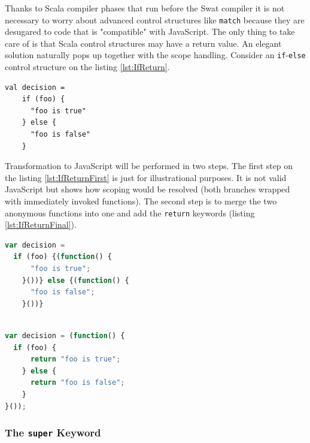 \documentclass[12pt,a4paper]{report}
\begin{document}
Thanks to Scala compiler phases that run before the Swat compiler it is not necessary to worry about advanced control structures like \texttt{match} because they are desugared to code that is "compatible" with JavaScript. The only thing to take care of is that Scala control structures may have a return value. An elegant solution naturally pops up together with the scope handling. Consider an \texttt{if}-\texttt{else} control structure on the listing \ref{lst:IfReturn}.

\begin{minipage}{\linewidth}
\begin{lstlisting}[caption={A condition with return value.},label={lst:IfReturn}]
val decision = 
	if (foo) {
	  "foo is true"
	} else {
	  "foo is false"
	}
\end{lstlisting}
\end{minipage}

Transformation to JavaScript will be performed in two steps. The first step on the listing \ref{lst:IfReturnFirst} is just for illustrational purposes. It is not valid JavaScript but shows how scoping would be resolved (both branches wrapped with immediately invoked functions). The second step is to merge the two anonymous functions into one and add the \texttt{return} keywords (listing \ref{lst:IfReturnFinal}).

\begin{center}
\begin{minipage}{.48\textwidth}
  \begin{lstlisting}[language=JavaScript,caption={The first step of condition compilation.},label={lst:IfReturnFirst},showlines=true]
var decision =
  if (foo) {(function() {
	  "foo is true";
	}())} else {(function() {
	  "foo is false";
	}())}
	
  \end{lstlisting}
\end{minipage}
\hfill
\begin{minipage}{.48\textwidth}
  \begin{lstlisting}[language=JavaScript,caption={The result of condition compilation.},label={lst:IfReturnFinal}]
var decision = (function() {
  if (foo) {
	  return "foo is true";
	} else {
	  return "foo is false";
	}
}());
  \end{lstlisting}
\end{minipage}
\end{center}

\subsubsection*{The \texttt{super} Keyword}
\end{document}

